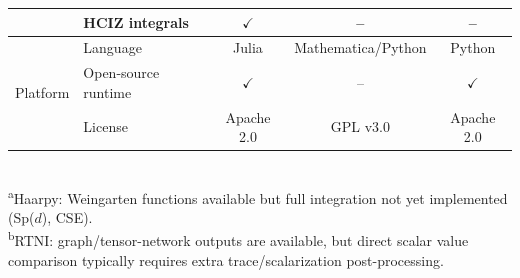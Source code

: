 \documentclass[manuscript,screen]{acmart}
\begin{document}
\begin{table}[t]
\begin{tabular}{llccc}
  & HCIZ integrals             & $\checkmark$ & --           & --   \\
\hline
\multirow{3}{*}{Platform}
  & Language            & Julia        & Mathematica/Python & Python \\
  & Open-source runtime & $\checkmark$ & --           & $\checkmark$ \\
  & License             & Apache 2.0   & GPL v3.0     & Apache 2.0   \\
\hline
\end{tabular}
\\[4pt]
{\footnotesize \textsuperscript{a}Haarpy: Weingarten functions available but full integration not yet implemented (Sp($d$), CSE).\\
\textsuperscript{b}RTNI: graph/tensor-network outputs are available, but direct scalar value comparison typically requires extra trace/scalarization post-processing.}
\end{table}
\end{document}
